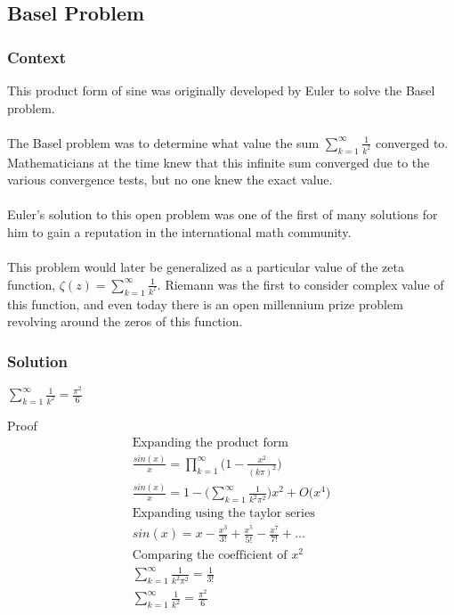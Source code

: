 \documentclass[a4paper]{article}
\begin{document}
\subsection{Basel Problem}
\label{basel}
\subsubsection{Context}
This product form of sine was originally developed by Euler to solve the Basel problem. 
\\
\\
The Basel problem was to determine what value the sum $\sum_{k=1}^{\infty} \frac{1}{k^2}$ converged to. Mathematicians at the time knew that this infinite sum converged due to the various convergence tests, but no one knew the exact value. 
\\
\\
Euler's solution to this open problem was one of the first of many solutions for him to gain a reputation in the international math community.
\\
\\
This problem would later be generalized as a particular value of the zeta function, $\zeta(z) = \sum_{k=1}^{\infty} \frac{1}{k^z}$. Riemann was the first to consider complex value of this function, and even today there is an open millennium prize problem revolving around the zeros of this function. 
\subsubsection{Solution}
\begin{theorem} 
$\boxed{\sum_{k=1}^{\infty} \frac{1}{k^2} =  \frac{\pi^2}{6}}$

Proof\\
\begin{gather*}
\text{Expanding the product form }
\\
\frac{sin(x)}{x} = \prod_{k=1}^{\infty} \Big( 1-\frac{x^2}{(k\pi)^2} \Big) 
\\
\frac{sin(x)}{x} = 1 - \Big( \sum_{k=1}^{\infty} \frac{1}{k^2 \pi^2} \Big) x^2 + O\Big( x^4 \Big)
\\
\text{Expanding using the taylor series }\\
sin(x) = x - \frac{x^3}{3!} + \frac{x^5}{5!} - \frac{x^7}{7!} + ... 
\\
\text{Comparing the coefficient of } x^2 
\\
\sum_{k=1}^{\infty} \frac{1}{k^2 \pi^2} = \frac{1}{3!}
\\
\sum_{k=1}^{\infty} \frac{1}{k^2} = \frac{\pi^2}{6}
\end{gather*}
\end{theorem}
\end{document}
